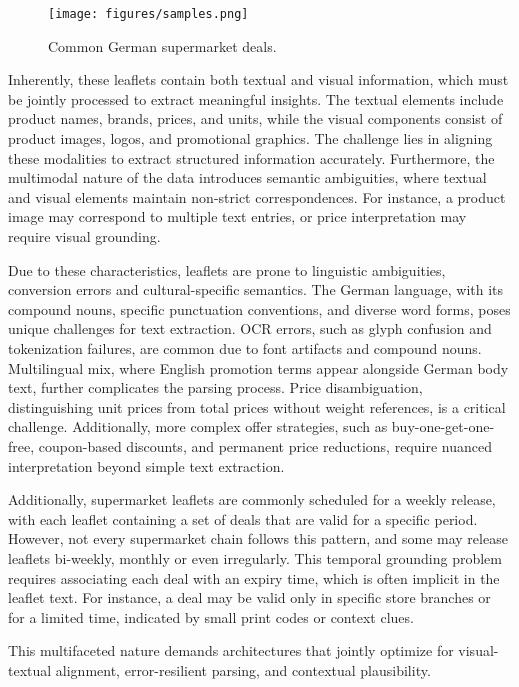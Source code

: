 \documentclass[11pt]{article}
\begin{document}
\begin{figure}[h!]
    \centering
    \texttt{[image: figures/samples.png]}
    \caption{Common German supermarket deals.}
    \label{fig:leaflet_data_samples}
\end{figure}

Inherently, these leaflets contain both textual and visual information, which must be jointly processed to extract meaningful insights. The textual elements include product names, brands, prices, and units, while the visual components consist of product images, logos, and promotional graphics. The challenge lies in aligning these modalities to extract structured information accurately. Furthermore, the multimodal nature of the data introduces semantic ambiguities, where textual and visual elements maintain non-strict correspondences. For instance, a product image may correspond to multiple text entries, or price interpretation may require visual grounding.

Due to these characteristics, leaflets are prone to linguistic ambiguities, conversion errors and cultural-specific semantics. The German language, with its compound nouns, specific punctuation conventions, and diverse word forms, poses unique challenges for text extraction. OCR errors, such as glyph confusion and tokenization failures, are common due to font artifacts and compound nouns. Multilingual mix, where English promotion terms appear alongside German body text, further complicates the parsing process. Price disambiguation, distinguishing unit prices from total prices without weight references, is a critical challenge. Additionally, more complex offer strategies, such as buy-one-get-one-free, coupon-based discounts, and permanent price reductions, require nuanced interpretation beyond simple text extraction.

Additionally, supermarket leaflets are commonly scheduled for a weekly release, with each leaflet containing a set of deals that are valid for a specific period. However, not every supermarket chain follows this pattern, and some may release leaflets bi-weekly, monthly or even irregularly. This temporal grounding problem requires associating each deal with an expiry time, which is often implicit in the leaflet text. For instance, a deal may be valid only in specific store branches or for a limited time, indicated by small print codes or context clues.

This multifaceted nature demands architectures that jointly optimize for visual-textual alignment, error-resilient parsing, and contextual plausibility.
\end{document}
